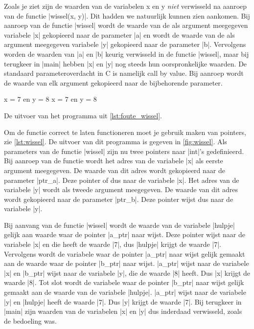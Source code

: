 Zoals je ziet zijn de waarden van de variabelen x en y \emph{niet} verwisseld na aanroep van de functie |wissel(x, y)|.
Dit hadden we natuurlijk kunnen zien aankomen.
Bij aanroep van de functie |wissel| wordt de waarde van de als argument meegegeven variabele |x| gekopieerd naar de parameter |a| en wordt de waarde van de als argument meegegeven variabele |y| gekopieerd naar de parameter |b|.
Vervolgens worden de waarden van |a| en |b| keurig verwisseld in de functie |wissel|, maar bij terugkeer in |main| hebben |x| en |y| nog steeds hun oorspronkelijke waarden.
De standaard parameteroverdacht in C is namelijk call by value.
Bij aanroep wordt de waarde van elk argument gekopieerd naar de bijbehorende parameter.    


\begin{myFigure}[!htbp]
	\centering%
	\begin{coutput}
x = 7 en y = 8
x = 7 en y = 8
	\end{coutput}
	\caption{De uitvoer van het programma uit \cref{lst:foute_wissel}.}
	\label{fig:foute_wissel}
\end{myFigure}

Om de functie correct te laten functioneren moet je gebruik maken van pointers, zie \cref{lst:wissel}.
De uitvoer van dit programma is gegeven in \cref{fig:wissel}.
Als parameters van de functie |wissel| zijn nu twee pointers naar |int|'s gedefinieerd.
Bij aanroep van de functie wordt het adres van de variabele |x| als eerste argument meegegeven.
De waarde van dit adres wordt gekopieerd naar de parameter |ptr_a|.
Deze pointer  of  dus naar de variabele |x|.
Het adres van de variabele |y| wordt als tweede argument meegegeven.
De waarde van dit adres wordt gekopieerd naar de parameter |ptr_b|.
Deze pointer wijst dus naar de variabele |y|.

Bij aanvang van de functie |wissel| wordt de waarde van de variabele |hulpje| gelijk aan waarde waar de pointer |a_ptr| naar wijst.
Deze pointer wijst naar de variabele |x| en die heeft de waarde |7|, dus |hulpje| krijgt de waarde |7|.
Vervolgens wordt de variabele waar de pointer |a_ptr| naar wijst gelijk gemaakt aan de waarde waar de pointer |b_ptr| naar wijst.
|a_ptr| wijst naar de variabele |x| en |b_ptr| wijst naar de variabele |y|, die de waarde |8| heeft.
Dus |x| krijgt de waarde |8|.
Tot slot wordt de variabele waar de pointer |b_ptr| naar wijst gelijk gemaakt aan de waarde van de variabele |hulpje|.
|a_ptr| wijst naar de variabele |y| en |hulpje| heeft de waarde |7|.
Dus |y| krijgt de waarde |7|.
Bij terugkeer in |main| zijn waarden van de variabelen |x| en |y| dus inderdaad verwisseld, zoals de bedoeling was.

